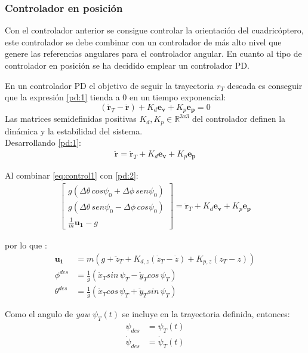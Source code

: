 \subsubsection{Controlador en posición}

Con el controlador anterior se consigue controlar la orientación del cuadricóptero, este controlador se debe combinar con un controlador de más alto nivel que genere las referencias angulares para el controlador angular.
En cuanto al tipo de controlador en posición se ha decidido emplear un controlador PD. 

En un controlador PD el objetivo de seguir la trayectoria $r_T$ deseada es conseguir que la expresión \ref{pd:1} tienda a 0 en un tiempo exponencial:
\begin{equation}
	\label{pd:1}
	\left(\mathbf{\ddot{r}}_{T} - \mathbf{\ddot{r}}\right) + K_d \mathbf{e_v} + K_p \mathbf{e_p} = 0
\end{equation}
Las matrices  semidefinidas positivas $K_d,K_p \in \mathbb{R}^{3x3}$ del controlador definen la dinámica y la estabilidad del sistema.
\\

Desarrollando \ref{pd:1}:
\begin{align}
	\label{pd:2}
	\mathbf{\ddot{r}}= \mathbf{\ddot{r}}_{T} + K_d \mathbf{e_v} + K_p \mathbf{e_p}
\end{align}

Al combinar \ref{eq:control1} con \ref{pd:2}:
\begin{align}\begin{bmatrix}
		g (\Delta\theta\, cos \psi_0 + \Delta\phi\,sen\psi_0)\\
		g(\Delta\theta\, sen \psi_0  - \Delta\phi\,cos\psi_0) \\
		\frac{1}{m}\mathbf{u_1}-g
	\end{bmatrix} 	= \mathbf{\ddot{r}}_T + K_d \mathbf{e_v} + K_p \mathbf{e_p}
\end{align}

por lo que :
\begin{align}
	\mathbf{u_1} &=m\left(g + \ddot{z}_T+ K_{d,z}(\dot{z}_T-\dot{z}) + K_{p,z}(z_T-z)\right)\\
	\phi^{des} &= \frac{1}{g}\left(\ddot{x}_{T} sin\,\psi_T -\ddot{y}_{T} cos\,\psi_T \right)\\
	\theta^{des} &= \frac{1}{g}\left(\ddot{x}_{T} cos\,\psi_T +\ddot{y}_{T} sin\,\psi_T \right)
\end{align}

Como el angulo de \textit{yaw} $\psi_T(t)$ se incluye en la trayectoria definida, entonces:
\begin{align}
	\psi_{des} &= \psi_T(t)\\
		\dot\psi_{des} &= \dot\psi_T(t)
\end{align} 

